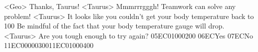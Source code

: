 <Geo> Thanks, Taurus! 
<Taurus> Mmmrrrgggh! Teamwork can solve any problem! 
<Taurus> It looks like you couldn't get your body temperature back to 100%
Be mindful of the fact that your body temperature gauge will drop. 
<Taurus> Are you tough enough to try again? 
{05}{EC}{01}{00}{02}{00}   {06}{EC}Yes   {07}{EC}No 
{11}{EC}{00}{00}{03}{00}{11}{EC}{01}{00}{04}{00}
